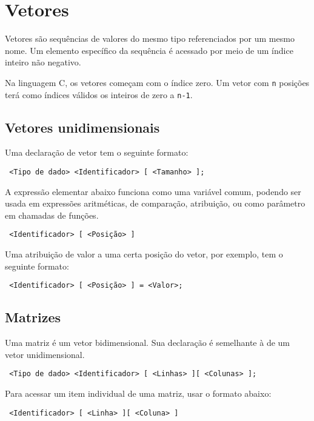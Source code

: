 
\chapter{Vetores}

Vetores são sequências de valores do mesmo tipo referenciados por um mesmo nome. Um elemento específico da sequência é acessado por meio de um índice inteiro não negativo.

Na linguagem C, os vetores começam com o índice zero. Um vetor com {\tt n} posições terá como índices válidos os inteiros de zero a {\tt n-1}.


\section{Vetores unidimensionais}

Uma declaração de vetor tem o seguinte formato:

\NEWLINE
{\tt
<Tipo de dado> <Identificador> [ <Tamanho> ];
}
\NEWLINE

A expressão elementar abaixo funciona como uma variável comum, podendo ser usada em expressões aritméticas, de comparação, atribuição, ou como parâmetro em chamadas de funções.

\NEWLINE
{\tt
<Identificador> [ <Posição> ]
}
\NEWLINE

Uma atribuição de valor a uma certa posição do vetor, por exemplo, tem o seguinte formato:

\NEWLINE
{\tt
<Identificador> [ <Posição> ] = <Valor>;
}
\NEWLINE


\section{Matrizes}

Uma matriz é um vetor bidimensional. Sua declaração é semelhante à de um vetor unidimensional.

\NEWLINE
{\tt
<Tipo de dado> <Identificador> [ <Linhas> ][ <Colunas> ];
}
\NEWLINE


Para acessar um item individual de uma matriz, usar o formato abaixo:

\NEWLINE
{\tt
<Identificador> [ <Linha> ][ <Coluna> ]
}
\NEWLINE


